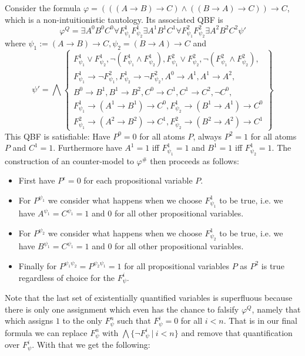 \documentclass[a4paper,UKenglish,cleveref, autoref, thm-restate]{lipics-v2021}
\begin{document}
\begin{example}
	Consider the formula $\varphi = (((A\to B)\to C)\wedge((B\to A)\to C))\to C$, which is a non-intuitionistic tautology. Its associated QBF is $$\varphi^Q = \exists A^0B^0C^0\forall F_{\psi_1}^1F_{\psi_2}^1 \exists A^1B^1C^1\forall F_{\psi_1}^2F_{\psi_2}^2 \exists A^2B^2C^2\psi'$$where $\psi_1 := (A\to B)\to C, \psi_2 = (B\to A)\to C$ and $$\psi' = \bigwedge\left\{\begin{matrix}
		F^1_{\psi_1}\vee F^1_{\psi_2}, \neg(F^1_{\psi_1}\wedge F^1_{\psi_2}), F^2_{\psi_1}\vee F^2_{\psi_2},\neg(F^2_{\psi_1}\wedge F^2_{\psi_2}),\\F^1_{\psi_1}\to\neg F^2_{\psi_1},F^1_{\psi_2}\to\neg F^2_{\psi_2}, A^0\to A^1,A^1\to A^2,
		\\B^0\to B^1, B^1\to B^2, C^0\to C^1, C^1\to C^2,\neg C^0, \\
		F^1_{\psi_1}\to (A^1\to B^1)\to C^0, F^1_{\psi_2}\to(B^1\to A^1)\to C^0\\
		F^2_{\psi_1}\to (A^2\to B^2)\to C^1, F^2_{\psi_2}\to(B^2\to A^2)\to C^1
	\end{matrix}\right\}$$
	This QBF is satisfiable: Have $P^0 = 0$ for all atoms $P$, always $P^2 = 1$ for all atoms $P$ and $C^1 = 1$. Furthermore have $A^1 = 1$ iff $F^1_{\psi_1} = 1$ and $B^1 = 1$ iff $F^1_{\psi_2} = 1$. The construction of an counter-model to $\varphi^\#$ then proceeds as follows:
	\begin{itemize}
		\item First have $P^\epsilon = 0$ for each propositional variable $P$.
		\item For $P^{\psi_1}$ we consider what happens when we choose $F^1_{\psi_1}$ to be true, i.e. we have $A^{\psi_1} = C^{\psi_1} = 1$ and $0$ for all other propositional variables.
		\item For $P^{\psi_2}$ we consider what happens when we choose $F^1_{\psi_2}$ to be true, i.e. we have $B^{\psi_1} = C^{\psi_1} = 1$ and $0$ for all other propositional variables.
		\item Finally for $P^{\psi_1\psi_2} = P^{\psi_2\psi_1} = 1$ for all propositional variables $P$ as $P^2$ is true regardless of choice for the $F^i_\psi$.
	\end{itemize}
\end{example}	

Note that the last set of existentially quantified variables is superfluous because there is only one assignment which even has the chance to falsify $\varphi^Q$, namely that which assigns $1$ to the only $F_\psi^n$ such that $F_\psi^i = 0$ for all $i < n$. That is in our final formula we can replace $F_\psi^n$ with $\bigwedge\{\neg F_\psi^i\:|\:i < n\}$ and remove that quantification over $F_\psi^i$. With that we get the following:
\end{document}
